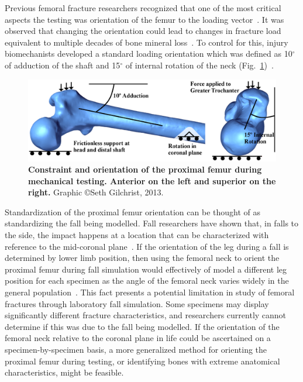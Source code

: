 Previous femoral fracture researchers recognized that one of the most critical aspects the testing was orientation of the femur to the loading vector~\citep{pinilla_impact_1996, backman_proximal_1957, ford_effect_1996}.
It was observed that changing the orientation could lead to changes in fracture load equivalent to multiple decades of bone mineral loss~\citep{pinilla_impact_1996, ford_effect_1996}.
To control for this, injury biomechanists developed a standard loading orientation which was defined as 10$^\circ$ of adduction of the shaft and 15$^\circ$ of internal rotation of the neck (Fig.~\ref{fig:version_Constraints})~\citep{courtney_age-related_1995, de_bakker_during_2009, courtney_effects_1994, manske_femoral_2006, lochmuller_mechanical_2002, backman_proximal_1957}.

\begin{figure}
\centering
\includegraphics[width=\linewidth]{./appendixVersion/figures/FEM_Constraints}
\caption[Constraints and orientation]{\textbf{Constraint and orientation of the proximal femur during mechanical testing. Anterior on the left and superior on the right.} Graphic \copyright Seth Gilchrist, 2013.}
\label{fig:version_Constraints}
\end{figure}


Standardization of the proximal femur orientation can be thought of as standardizing the fall being modelled.
Fall researchers have shown that, in falls to the side, the impact happens at a location that can be characterized with reference to the mid-coronal plane~\citep{feldman_reducing_2007}.
If the orientation of the leg during a fall is determined by lower limb position, then using the femoral neck to orient the proximal femur during fall simulation would effectively of model a different leg position for each specimen as the angle of the femoral neck varies widely in the general population~\citep{toogood_proximal_2009}.
This fact presents a potential limitation in study of femoral fractures through laboratory fall simulation.
Some specimens may display significantly different fracture characteristics, and researchers currently cannot determine if this was due to the fall being modelled.
If the orientation of the femoral neck relative to the coronal plane in life could be ascertained on a specimen-by-specimen basis, a more generalized method for orienting the proximal femur during testing, or identifying bones with extreme anatomical characteristics, might be feasible.

